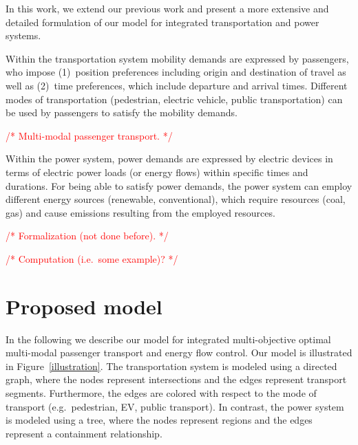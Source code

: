 \documentclass[conference]{IEEEtran}
\newcommand{\todo}[1]{\textcolor{red}{/* #1 */}}
\begin{document}
	In this work, we extend our previous work and present a more extensive and detailed formulation of our model for integrated transportation and power systems. 
	
	Within the transportation system mobility demands are expressed by passengers, who impose (1)~position preferences including origin and destination of travel as well as (2)~time preferences, which include departure and arrival times. Different modes of transportation (pedestrian, electric vehicle, public transportation) can be used by passengers to satisfy the mobility demands. 
	
	\todo{Multi-modal passenger transport.}
	
	Within the power system, power demands are expressed by electric devices in terms of electric power loads (or energy flows) within specific times and durations. For being able to satisfy power demands, the power system can employ different energy sources (renewable, conventional), which require resources (coal, gas) and cause emissions resulting from the employed resources.
	
	\todo{Formalization (not done before).}
	
	\todo{Computation (i.e.\ some example)?}
	
	\section{Proposed model}
	\label{proposed_model}
	
	In the following we describe our model for integrated multi-objective optimal multi-modal passenger transport and energy flow control. Our model is illustrated in Figure~\ref{illustration}. The transportation system is modeled using a directed graph, where the nodes represent intersections and the edges represent transport segments. Furthermore, the edges are colored with respect to the mode of transport (e.g.\ pedestrian, EV, public transport). In contrast, the power system is modeled using a tree, where the nodes represent regions and the edges represent a containment relationship.
	
\end{document}
